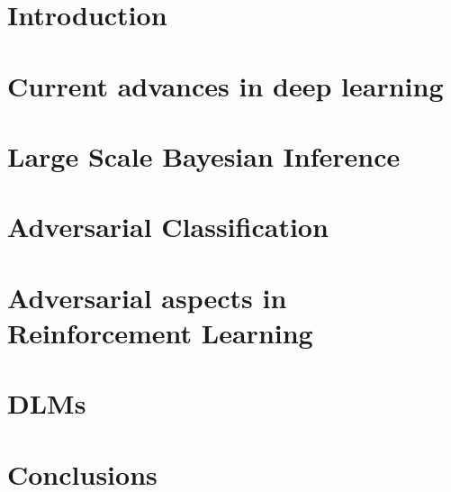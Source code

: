 \documentclass[a4paper, 11pt, openright, twoside]{reportPhD}
\numberwithin{equation}{section}
\numberwithin{figure}{chapter}
\numberwithin{table}{chapter}
\begin{document}
\chapter{Introduction}\label{cha:intro}

\setcounter{page}{1}



%

\chapter{Current advances in deep learning}\label{cha:deep}


\chapter{Large Scale Bayesian Inference}\label{cha:bayes}



\chapter{Adversarial Classification}\label{cha:adv}



\chapter{Adversarial aspects in Reinforcement Learning}\label{cha:ararl}


\chapter{DLMs}\label{cha:dlm}


\chapter{Conclusions}\label{cha:conclusions}

\end{document}
